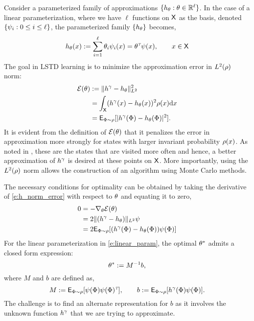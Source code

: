 Consider a parameterized family of approximations $\{h_\theta : \theta \in \mathbb{R}^\ell\}$. In the case of a linear parameterization, where we have $\ell$ functions on ${\sf X}$ as the basis, denoted $\{\psi_i : 0 \leq i \leq \ell\}$, the parameterized family $\{h_\theta\}$ becomes,
\begin{equation}
h_\param(x) := \sum_{i=1}^\ell \param_i \basis_i(x) = \param^\transpose \basis(x), \qquad x \in \state
\label{e:linear_param}
\end{equation}
The goal in LSTD learning is to minimize the approximation error in $L^2(\rho)$ norm:
\begin{equation}
\begin{aligned}
\mathcal{E}(\param) &:=  \| h^\discount - h_\param \|^2_{L^2} \\
& = \int_\state (h^\discount(x) - h_\param(x))^2 \pr(x) \ud x \\
& = \Expect_{\markovstate \sim \pr} [|h^\discount(\markovstate) - h_\param(\markovstate)|^2].
\label{e:h_norm_error}
\end{aligned}
\end{equation}
It is evident from the definition of $\mathcal{E}(\theta)$ that it penalizes the error in approximation more strongly for states with larger invariant probability $\rho(x)$. As noted in \cite{ctcn}, these are the states that are visited more often and hence, a better approximation of $h^\gamma$ is desired at these points on ${\sf X}$. More importantly, using the $L^2(\rho)$ norm allows the construction of an algorithm using Monte Carlo methods. 

The necessary conditions for optimality can be obtained by taking the derivative of \eqref{e:h_norm_error} with respect to $\theta$ and equating it to zero, 
\[
\begin{aligned}
0 &= - \nabla_\theta \mathcal{E}(\theta)\\
& = 2 \|(h^\gamma - h_\theta) \|_{L^2} \psi \\
& = 2 {\sf E}_{\Phi \sim \rho} [(h^\gamma(\Phi) - h_\theta(\Phi)) \psi(\Phi)]
\end{aligned}
\] 
For the linear parameterization in \eqref{e:linear_param}, the optimal $\theta^*$ admits a closed form expression:
\begin{equation}
\param^* := M^{-1} b,
\label{e:param_opt_lstd}
\end{equation}
where $M$ and $b$ are defined as,
\begin{equation}
M: = \Expect_{\markovstate \sim \pr} [\basis(\markovstate) \basis(\markovstate)^\transpose], \qquad b:= \Expect_{\markovstate \sim \pr} [h^\discount(\markovstate) \basis(\markovstate)].
\label{e:lstd_M_b}
\end{equation}
The challenge is to find an alternate representation for $b$ as it involves the unknown function $h^\gamma$ that we are trying to approximate.  

